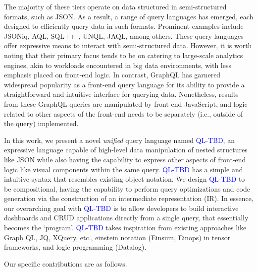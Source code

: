 \documentclass[runningheads]{llncs}
\newcommand{\lang}{\textcolor{blue}{QL-TBD}}
\begin{document}
The majority of these tiers operate on data structured in semi-structured
formats, such as JSON.
As a result, a range of query languages has emerged, each designed to efficiently
query data in such formats.
Prominent examples include JSONiq, AQL, SQL++~\cite{sqlpp}, UNQL, JAQL, among others.
These query languages offer expressive means to interact with semi-structured data.
However, it is worth noting that their primary focus tends to be on catering to
large-scale analytics engines, akin to workloads encountered in big data environments,
with less emphasis placed on front-end logic.
In contrast, GraphQL has garnered widespread popularity as a front-end query language
for its ability to provide a straightforward and intuitive interface for querying data.
Nonetheless, results from these GraphQL queries are manipulated by front-end JavaScript,
and logic related to other aspects of the front-end needs to be separately
(i.e., outside of the query) implemented.


In this work, we present a novel \emph{unified} query language named \lang{}, an expressive
language capable of high-level data manipulation of nested structures like JSON while 
also having the capability to express other aspects of front-end logic like visual components
within the same query.
\lang{} has a simple and intuitive syntax that resembles existing object notation.
We design \lang{} to be compositional, having the capability to perform query optimizations
and code generation via the construction of an intermediate representation (IR).
In essence, our overarching goal with \lang{} is to allow developers to build interactive dashboards and 
CRUD applications directly from a single query, that essentially becomes the `program'.
\lang{} takes inspiration from existing approaches like Graph QL, JQ, XQuery, etc., einstein
notation (Einsum, Einops) in tensor frameworks, and logic programming (Datalog).


Our specific contributions are as follows.
\end{document}
